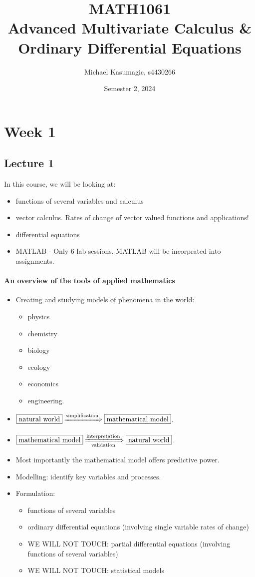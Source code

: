 \documentclass{report}
\title{\Huge{MATH1061}\\Advanced Multivariate Calculus \& Ordinary Differential Equations}
\author{\huge{Michael Kasumagic, s4430266}}
\date{\huge{Semester 2, 2024}}
\begin{document}
\maketitle
\newpage%
\tableofcontents
\pagebreak

\chapter{Week 1}
\section{Lecture 1}
In this course, we will be looking at:
\begin{itemize}
	\item functions of several variables and calculus
	\item vector calculus. Rates of change of vector valued functions and applications!
	\item differential equations
	\item MATLAB - Only 6 lab sessions. MATLAB will be incorprated into assignments.
\end{itemize}

\subsubsection*{An overview of the tools of applied mathematics}
\begin{itemize}
	\item Creating and studying models of phenomena in the world:
	\begin{itemize}
		\item physics
		\item chemistry
		\item biology
		\item ecology
		\item economics
		\item engineering.
	\end{itemize}
	\item $\boxed{\text{natural world}} \xRightarrow{\text{simplification}} \boxed{\text{mathematical model}}$.
	\item $\boxed{\text{mathematical model}} \xRightarrow[\text{validation}]{\text{interpretation}} \boxed{\text{natural world}}$.
	\item Most importantly the $\boxed{\text{mathematical model}}$ offers predictive power.
	\item Modelling: identify key variables and processes.
	\item Formulation:
	\begin{itemize}
		\item functions of several variables
		\item ordinary differential equations (involving single variable rates of change)
		\item WE WILL NOT TOUCH: partial differential equations (involving functions of several variables)
		\item WE WILL NOT TOUCH: statistical models
	\end{itemize}
\end{itemize}
\end{document}
